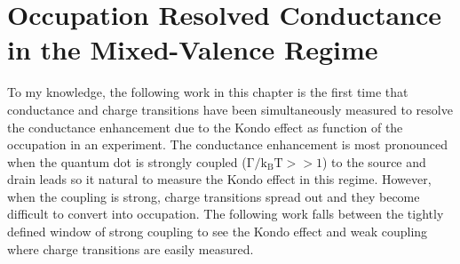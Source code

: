 \chapter[Conductance in the Mixed-Valence Regime]{Occupation Resolved Conductance in the Mixed-Valence Regime}\label{cha:mixed_valence_conductance}

To my knowledge, the following work in this chapter is the first time that conductance and charge transitions have been simultaneously measured to resolve the conductance enhancement due to the Kondo effect as function of the occupation in an experiment. The conductance enhancement is most pronounced when the quantum dot is strongly coupled ($\mathrm{\Gamma/k_BT}>>1$) to the source and drain leads so it natural to measure the Kondo effect in this regime. However, when the coupling is strong, charge transitions spread out and they become difficult to convert into occupation. The following work falls between the tightly defined window of strong coupling to see the Kondo effect and weak coupling where charge transitions are easily measured. 



